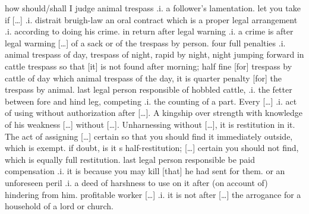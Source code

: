 \documentclass[11pt]{article}
\begin{document}
\begin{pages}
 \begin{Rightside}
    \beginnumbering
    \pstart  
    how should/shall I judge animal trespass .i. a follower's lamentation.  let you take if [\ldots] .i. distrait bruigh-law an oral contract which is a proper legal arrangement .i. according to doing his crime.  in return after legal warning .i. a crime is after legal warming [\ldots] of a sack or of the trespass by person.  four full penalties .i. animal trespass of day, trespass of night, rapid by night, night jumping forward in cattle trespass so that [it] is not found after morning;  half fine [for] trespass by cattle of day which animal trespass of the day, it is quarter penalty [for] the trespass by animal.  last legal person responsible of hobbled cattle, .i. the fetter between fore and hind leg, competing .i. the counting of a part. Every [\ldots] .i. act of using without authorization after [\ldots]. A kingship over strength with knowledge of his weakness [\ldots] without [\ldots].  Unharnessing without [\ldots], it is restitution in it.  The act of assigning [\ldots] certain so that you should find it immediately outside, which is exempt.  if doubt, is it s half-restitution; [\ldots] certain you should not find, which is equally full restitution.  last legal person responsible be paid compensation .i. it is because you may kill [that] he had sent for them.  or an unforeseen peril .i. a deed of harshness to use on it after (on account of) hindering from him. profitable worker [\ldots] .i. it is not after [\dots] the arrogance for a household of a lord or church.
    \pend

   \endnumbering
  \end{Rightside}
  \Pages


\end{pages}
\end{document}
